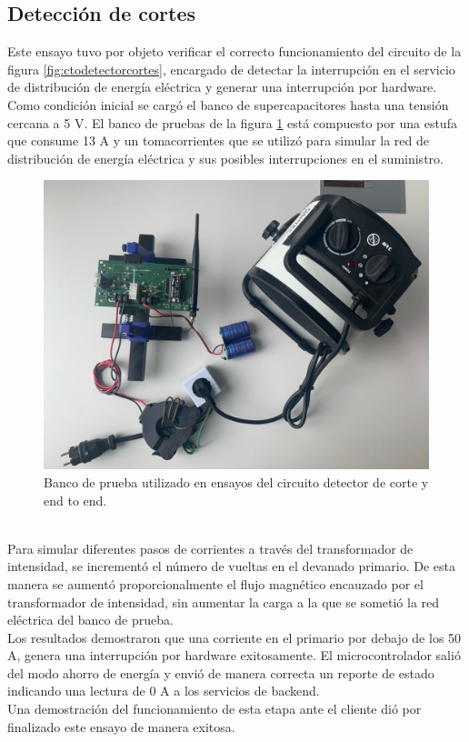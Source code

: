\vspace{200px}
\subsection{Detecci\'{o}n de cortes}
Este ensayo tuvo por objeto verificar el correcto funcionamiento del circuito de la figura \ref{fig:ctodetectorcortes}, encargado de detectar la interrupci\'{o}n en el servicio de distribuci\'{o}n de energía el\'{e}ctrica y generar una interrupci\'{o}n por hardware.\\
Como condici\'{o}n inicial se carg\'{o} el banco de supercapacitores hasta una tensión cercana a 5 V. 
El banco de pruebas de la figura \ref{fig:bancopruebae2e2} est\'{a} compuesto por una estufa que consume 13 A y un tomacorrientes que se utiliz\'{o} para simular la red de distribuci\'{o}n de energía el\'{e}ctrica y sus posibles interrupciones en el suministro.\\
\begin{figure}[h]
	\centering
	\includegraphics[width=1.0\linewidth]{Figures/banco_prueba_e2e_1}
	\caption{Banco de prueba utilizado en ensayos del circuito detector de corte y end to end.}
	\label{fig:bancopruebae2e2}
\end{figure}\\
Para simular diferentes pasos de corrientes a trav\'{e}s del transformador de intensidad, se increment\'{o} el n\'{u}mero de vueltas en el devanado primario. De esta manera se aument\'{o} proporcionalmente el flujo magn\'{e}tico encauzado por el transformador de intensidad, sin aumentar la carga a la que se someti\'{o} la red el\'{e}ctrica del banco de prueba.\\
Los resultados demostraron que una corriente en el primario por debajo de los 50 A, genera una interrupci\'{o}n por hardware exitosamente. El microcontrolador sali\'{o} del modo ahorro de energía y envi\'{o} de manera correcta un reporte de estado indicando una lectura de 0 A a los servicios de backend.\\
Una demostraci\'{o}n del funcionamiento de esta etapa ante el cliente dió por finalizado este ensayo de manera exitosa.\\

